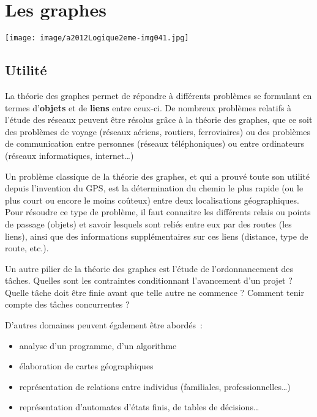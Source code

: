 \chapter{Les graphes}

\begin{center}
\texttt{[image: image/a2012Logique2eme-img041.jpg]}
\end{center}
	

\section{Utilité}

	La théorie des graphes permet de répondre à différents 
	problèmes se formulant en termes d'\textbf{objets} et de
	\textbf{liens} entre ceux-ci. De nombreux problèmes relatifs 
	à l'étude des réseaux peuvent être résolus grâce à la
	théorie des graphes, que ce soit des problèmes de voyage 
	(réseaux aériens, routiers, ferroviaires) ou des problèmes de
	communication entre personnes (réseaux téléphoniques) 
	ou entre ordinateurs (réseaux informatiques, internet{\dots})

	Un problème classique de la théorie des graphes, et qui a 
	prouvé toute son utilité depuis l'invention du GPS, est la
	détermination du chemin le plus rapide (ou le plus court 
	ou encore le moins coûteux) entre deux localisations
	géographiques. Pour résoudre ce type de problème, il faut 
	connaitre les différents relais ou points de passage (objets)
	et savoir lesquels sont reliés entre eux par des routes 
	(les liens), ainsi que des informations supplémentaires sur ces
	liens (distance, type de route, etc.).

	Un autre pilier de la théorie des graphes est l'étude de 
	l'ordonnancement des tâches. Quelles sont les contraintes
	conditionnant l'avancement d'un projet ? Quelle tâche doit 
	être finie avant que telle autre ne commence ? Comment tenir
	compte des tâches concurrentes ?

	D'autres domaines peuvent également être abordés~:

	\begin{itemize}
		\item {
			analyse d'un programme, d'un algorithme}
		\item {
			élaboration de cartes géographiques}
		\item {
			représentation de relations entre individus (familiales, professionnelles{\dots})}
		\item {
			représentation d'automates d'états finis, de tables de décisions{\dots}}
	\end{itemize}
	
